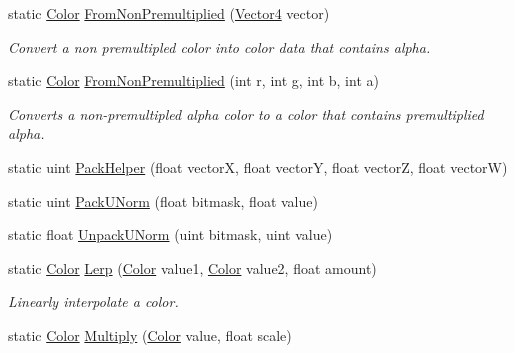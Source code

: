 \begin{DoxyCompactItemize}
\item 
static \hyperlink{struct_microsoft_1_1_xna_1_1_framework_1_1_color}{Color} \hyperlink{struct_microsoft_1_1_xna_1_1_framework_1_1_color_a7035a7709bcf7401a957e2f697d1181d}{From\+Non\+Premultiplied} (\hyperlink{struct_microsoft_1_1_xna_1_1_framework_1_1_vector4}{Vector4} vector)
\begin{DoxyCompactList}\small\item\em Convert a non premultipled color into color data that contains alpha.\end{DoxyCompactList}\item 
static \hyperlink{struct_microsoft_1_1_xna_1_1_framework_1_1_color}{Color} \hyperlink{struct_microsoft_1_1_xna_1_1_framework_1_1_color_a6b779c3ccada909aa4f6e141dfcda6d0}{From\+Non\+Premultiplied} (int r, int g, int b, int a)
\begin{DoxyCompactList}\small\item\em Converts a non-\/premultipled alpha color to a color that contains premultiplied alpha.\end{DoxyCompactList}\item 
static uint \hyperlink{struct_microsoft_1_1_xna_1_1_framework_1_1_color_a4e9c212c9b8806e587219d2f2f8e5cc3}{Pack\+Helper} (float vector\+X, float vector\+Y, float vector\+Z, float vector\+W)
\item 
static uint \hyperlink{struct_microsoft_1_1_xna_1_1_framework_1_1_color_a3452d1f883d2070b5cf1d7ad7b4c8133}{Pack\+U\+Norm} (float bitmask, float value)
\item 
static float \hyperlink{struct_microsoft_1_1_xna_1_1_framework_1_1_color_a7863063785406632ff89b0ab12ed0667}{Unpack\+U\+Norm} (uint bitmask, uint value)
\item 
static \hyperlink{struct_microsoft_1_1_xna_1_1_framework_1_1_color}{Color} \hyperlink{struct_microsoft_1_1_xna_1_1_framework_1_1_color_ad3f7367538fbbfc2333bbe5cb3e4ce22}{Lerp} (\hyperlink{struct_microsoft_1_1_xna_1_1_framework_1_1_color}{Color} value1, \hyperlink{struct_microsoft_1_1_xna_1_1_framework_1_1_color}{Color} value2, float amount)
\begin{DoxyCompactList}\small\item\em Linearly interpolate a color.\end{DoxyCompactList}\item 
static \hyperlink{struct_microsoft_1_1_xna_1_1_framework_1_1_color}{Color} \hyperlink{struct_microsoft_1_1_xna_1_1_framework_1_1_color_ab0119d604dc722e383bf464a5942cf9d}{Multiply} (\hyperlink{struct_microsoft_1_1_xna_1_1_framework_1_1_color}{Color} value, float scale)

\end{DoxyCompactItemize}
